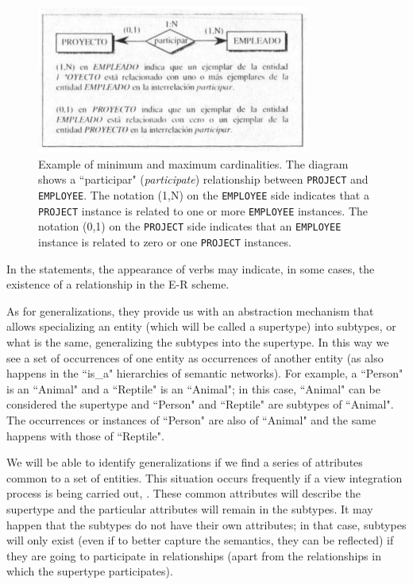 \documentclass{article}
\numberwithin{figure}{section}
\begin{document}
\begin{figure}
    \centering
    \includegraphics[width=0.8\textwidth]{figures/fig2}
    \caption{Example of minimum and maximum cardinalities. The diagram shows a ``participar" (\textit{participate}) relationship between \texttt{PROJECT} and \texttt{EMPLOYEE}. The notation (1,N) on the \texttt{EMPLOYEE} side indicates that a \texttt{PROJECT} instance is related to one or more \texttt{EMPLOYEE} instances. The notation (0,1) on the \texttt{PROJECT} side indicates that an \texttt{EMPLOYEE} instance is related to zero or one \texttt{PROJECT} instances.}
    \label{fig:fig1.2}
\end{figure}

In the statements, the appearance of verbs may indicate, in some cases, the existence of a relationship in the E-R scheme.

As for generalizations, they provide us with an abstraction mechanism that allows specializing an entity (which will be called a supertype) into subtypes, or what is the same, generalizing the subtypes into the supertype.  In this way we see a set of occurrences of one entity as occurrences of another entity (as also happens in the ``is\_a" hierarchies of semantic networks).  For example, a ``Person" is an ``Animal" and a ``Reptile" is an ``Animal"; in this case, ``Animal" can be considered the supertype and ``Person" and ``Reptile" are subtypes of ``Animal".  The occurrences or instances of ``Person" are also of ``Animal" and the same happens with those of ``Reptile".

We will be able to identify generalizations if we find a series of attributes common to a set of entities.  This situation occurs frequently if a view integration process is being carried out, \cite{demiguel1999fundamentos}.  These common attributes will describe the supertype and the particular attributes will remain in the subtypes.  It may happen that the subtypes do not have their own attributes; in that case, subtypes will only exist (even if to better capture the semantics, they can be reflected) if they are going to participate in relationships (apart from the relationships in which the supertype participates).
\end{document}
